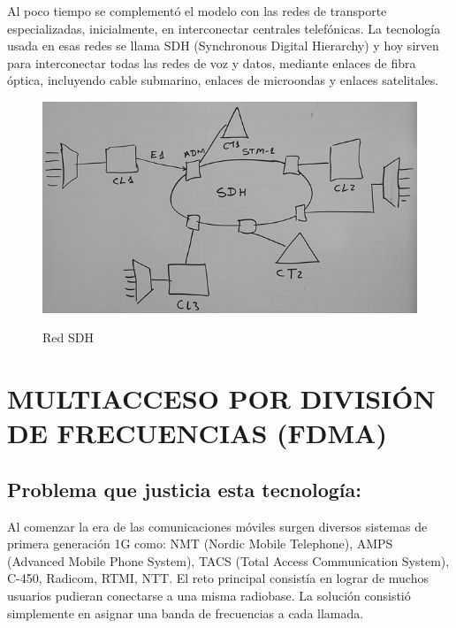 Al poco tiempo se complementó el modelo con las redes de transporte especializadas, inicialmente, en interconectar centrales telefónicas. La tecnología usada en esas redes se llama SDH (Synchronous Digital Hierarchy) y hoy sirven para interconectar todas las redes de voz y datos, mediante enlaces de fibra óptica, incluyendo cable submarino, enlaces de microondas y enlaces satelitales. \\

\begin{figure}[h!]
	\captionsetup{justification = raggedright, singlelinecheck = false}
	\caption{Red SDH} 
	\centering
	\includegraphics[scale=0.7]{Imagenes/SDH.png}
	\label{fig:SDH}
\end{figure}

\section{MULTIACCESO POR DIVISIÓN DE FRECUENCIAS (FDMA)}
\subsection{Problema que justicia esta tecnología:}

Al comenzar la era de las comunicaciones móviles surgen diversos sistemas de primera generación 1G como: NMT (Nordic Mobile Telephone), AMPS (Advanced Mobile Phone System), TACS (Total Access Communication System), C-450, Radicom, RTMI, NTT. El reto principal consistía en lograr de muchos usuarios pudieran conectarse a una misma radiobase. La solución consistió simplemente en asignar una banda de frecuencias a cada llamada. \\

